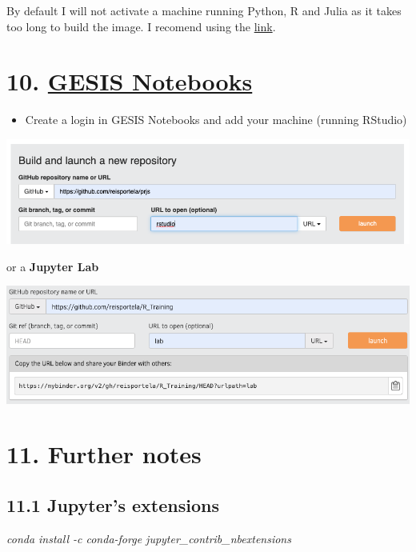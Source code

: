\documentclass[
  12pt,
]{article}
\providecommand{\tightlist}{%
  \setlength{\itemsep}{0pt}\setlength{\parskip}{0pt}}
\begin{document}
By default I will not activate a machine running Python, R and Julia as
it takes too long to build the image. I recomend using the
\href{http://beta.mybinder.org/v2/gh/binder-examples/julia_python/master}{link}.

\hypertarget{gesis-notebooks}{%
\section{\texorpdfstring{10. \href{https://notebooks.gesis.org/}{GESIS
Notebooks}}{10. GESIS Notebooks}}\label{gesis-notebooks}}

\begin{itemize}
\tightlist
\item
  Create a login in GESIS Notebooks and add your machine (running
  RStudio)
\end{itemize}

\includegraphics{figures/GESISNotebooks.png}

or a \textbf{Jupyter Lab}

\includegraphics{figures/jupyter_lab.png}

\hypertarget{further-notes}{%
\section{11. Further notes}\label{further-notes}}

\hypertarget{jupyters-extensions}{%
\subsection{11.1 Jupyter's extensions}\label{jupyters-extensions}}

\emph{conda install -c conda-forge jupyter\_contrib\_nbextensions}
\end{document}
